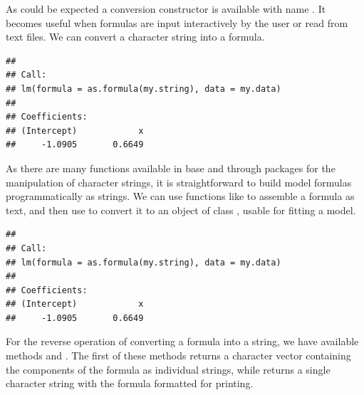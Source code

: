 \documentclass[krantz2]{krantz}\usepackage{knitr}%
\begin{document}
\begin{explainbox}
As could be expected a conversion constructor is available with name . It becomes useful when formulas are input interactively by the user or read from text files. We can convert a character string into a formula.

\begin{knitrout}\footnotesize
{}\color{fgcolor}\begin{kframe}
\begin{alltt}
 \hlkwb{<-} 
\hlstd{(}  
\end{alltt}
\begin{verbatim}
## 
## Call:
## lm(formula = as.formula(my.string), data = my.data)
## 
## Coefficients:
## (Intercept)            x  
##     -1.0905       0.6649
\end{verbatim}
\end{kframe}
\end{knitrout}

As there are many functions available in base \Rlang and through packages for the manipulation of character strings, it is straightforward to build model formulas programmatically as strings. We can use functions like  to assemble a formula as text, and then use  to convert it to an object of class , usable for fitting a model.

\begin{knitrout}\footnotesize
{}\color{fgcolor}\begin{kframe}
\begin{alltt}
 \hlkwb{<-} \hlstd{(}\hlstd{,} \hlstd{,}  \hlstd{=} \hlstd{)}
\hlstd{(}  
\end{alltt}
\begin{verbatim}
## 
## Call:
## lm(formula = as.formula(my.string), data = my.data)
## 
## Coefficients:
## (Intercept)            x  
##     -1.0905       0.6649
\end{verbatim}
\end{kframe}
\end{knitrout}

For the reverse operation of converting a formula into a string, we have available methods  and . The first of these methods returns a character vector containing the components of the formula as individual strings, while  returns a single character string with the formula formatted for printing.


\end{explainbox}
\end{document}
